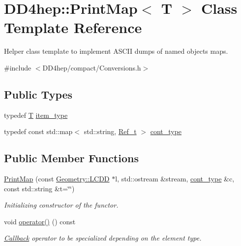 \hypertarget{struct_d_d4hep_1_1_print_map}{
\section{DD4hep::PrintMap$<$ T $>$ Class Template Reference}
\label{struct_d_d4hep_1_1_print_map}
}


Helper class template to implement ASCII dumps of named objects maps.  


{\ttfamily \#include $<$DD4hep/compact/Conversions.h$>$}\subsection*{Public Types}
\begin{DoxyCompactItemize}
\item 
typedef \hyperlink{class_t}{T} \hyperlink{struct_d_d4hep_1_1_print_map_a8d784c171bb184d181296a306cd1301d}{item\_\-type}
\item 
typedef const std::map$<$ std::string, \hyperlink{class_d_d4hep_1_1_handle}{Ref\_\-t} $>$ \hyperlink{struct_d_d4hep_1_1_print_map_a75356a94ee86763170e76a2096ec4cb5}{cont\_\-type}
\end{DoxyCompactItemize}
\subsection*{Public Member Functions}
\begin{DoxyCompactItemize}
\item 
\hyperlink{struct_d_d4hep_1_1_print_map_a5e9d6107e83c34022dd352fc04cf346a}{PrintMap} (const \hyperlink{class_d_d4hep_1_1_geometry_1_1_l_c_d_d}{Geometry::LCDD} $\ast$l, std::ostream \&stream, \hyperlink{struct_d_d4hep_1_1_print_map_a75356a94ee86763170e76a2096ec4cb5}{cont\_\-type} \&c, const std::string \&t=\char`\"{}\char`\"{})
\begin{DoxyCompactList}\small\item\em Initializing constructor of the functor. \item\end{DoxyCompactList}\item 
void \hyperlink{struct_d_d4hep_1_1_print_map_acda45067e3f2c8ad01e89c8bd0cd497e}{operator()} () const 
\begin{DoxyCompactList}\small\item\em \hyperlink{class_d_d4hep_1_1_callback}{Callback} operator to be specialized depending on the element type. \item\end{DoxyCompactList}\end{DoxyCompactItemize}
